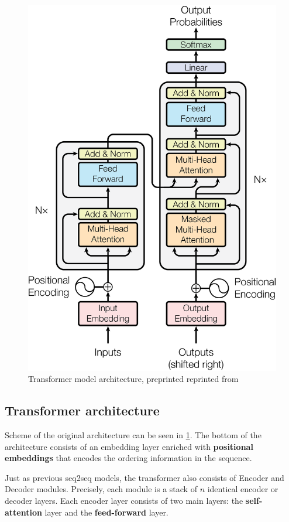 \begin{figure}
  \includegraphics[scale=0.5]{my_modules/multimedia/atalyned.png}
  \caption{Transformer model architecture, preprinted reprinted from \cite{vaswani2017attention}}
  \label{fig:transformer}
\end{figure}

\subsection{Transformer architecture}
Scheme of the original architecture can be seen in \ref{fig:transformer}. The bottom of the architecture consists of an embedding layer enriched with \textbf{positional embeddings} that encodes the ordering information in the sequence.

Just as previous seq2seq models, the transformer also consists of Encoder and Decoder modules. Precisely, each module is a stack of $n$ identical encoder or decoder layers. Each encoder layer consists of two main layers: the \textbf{self-attention} layer and the \textbf{feed-forward} layer.

